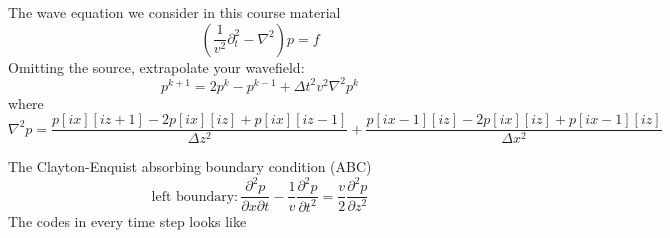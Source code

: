 The wave equation we consider in this course material
\begin{equation}\label{stateeq}
(\frac{1}{v^2}\partial_t^2 - \nabla^2 ) p=f
\end{equation}
Omitting the source, extrapolate your wavefield:
\begin{equation}\label{forwardupdate}
 p^{k+1}=2p^{k}-p^{k-1}+\Delta t^2 v^2 \nabla^2 p^k 
\end{equation}
where
\begin{equation}
 \nabla^2 p= \frac{p[ix][iz+1]-2p[ix][iz]+p[ix][iz-1]}{\Delta z^2} +\frac{p[ix-1][iz]-2p[ix][iz]+p[ix-1][iz]}{\Delta x^2}
\end{equation}


The Clayton-Enquist absorbing boundary condition (ABC) \citep{Clayton_1977_ABC}
\begin{equation}
 \mbox{left boundary}:\frac{\partial^2 p}{\partial x\partial t}-\frac{1}{v}\frac{\partial^2 p}{\partial t^2}=\frac{v}{2}\frac{\partial^2 p}{\partial z^2}
\end{equation}
The codes in every time step looks like
\lstset{language=c,numbers=left,numberstyle=\tiny,showstringspaces=false,frame=single}
